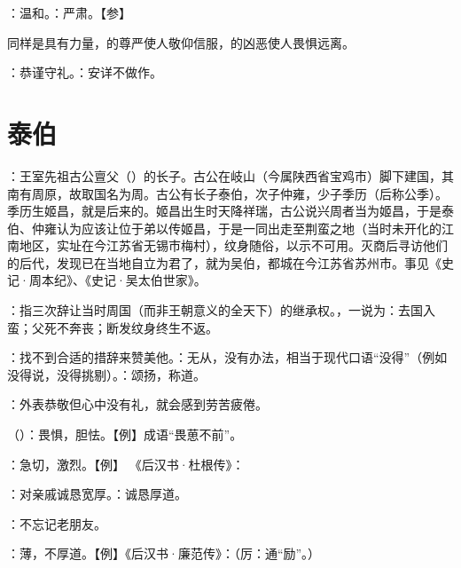 {
\item {}：温和。：严肃。【参】
\item 同样是具有力量，的尊严使人敬仰信服，的凶恶使人畏惧远离。
\item {}：恭谨守礼。：安详不做作。
}
{}



\chapter{泰伯}

{
\item {}：王室先祖古公亶父（）的长子。古公在岐山（今属陕西省宝鸡市）脚下建国，其南有周原，故取国名为周。古公有长子泰伯，次子仲雍，少子季历（后称公季）。季历生姬昌，就是后来的。姬昌出生时天降祥瑞，古公说兴周者当为姬昌，于是泰伯、仲雍认为应该让位于弟以传姬昌，于是一同出走至荆蛮之地（当时未开化的江南地区，实址在今江苏省无锡市梅村），纹身随俗，以示不可用。灭商后寻访他们的后代，发现已在当地自立为君了，就为吴伯，都城在今江苏省苏州市。事见《史记·周本纪》、《史记·吴太伯世家》。%
\item {}：指三次辞让当时周国（而非王朝意义的全天下）的继承权。，一说为：去国入蛮；父死不奔丧；断发纹身终生不返。 %
\item {}：找不到合适的措辞来赞美他。：无从，没有办法，相当于现代口语“没得”（例如没得说，没得挑剔）。：颂扬，称道。
}
{}


{
\item {}：外表恭敬但心中没有礼，就会感到劳苦疲倦。
\item {}（）：畏惧，胆怯。【例】成语“畏葸不前”。
\item {}：急切，激烈。【例】 《后汉书·杜根传》：
\item {}：对亲戚诚恳宽厚。：诚恳厚道。
\item {}：不忘记老朋友。
\item {}：薄，不厚道。【例】《后汉书·廉范传》：（厉：通“励”。）
}
{}


